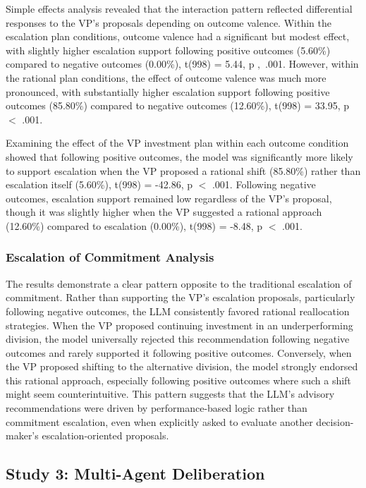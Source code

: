\documentclass[letterpaper]{article} %
\begin{document}
Simple effects analysis revealed that the interaction pattern reflected differential responses to the VP's proposals depending on outcome valence. Within the escalation plan conditions, outcome valence had a significant but modest effect, with slightly higher escalation support following positive outcomes (5.60\%) compared to negative outcomes (0.00\%), t(998) = 5.44, p $,$ .001. However, within the rational plan conditions, the effect of outcome valence was much more pronounced, with substantially higher escalation support following positive outcomes (85.80\%) compared to negative outcomes (12.60\%), t(998) = 33.95, p $<$ .001. 

Examining the effect of the VP investment plan within each outcome condition showed that following positive outcomes, the model was significantly more likely to support escalation when the VP proposed a rational shift (85.80\%) rather than escalation itself (5.60\%), t(998) = -42.86, p $<$ .001. Following negative outcomes, escalation support remained low regardless of the VP's proposal, though it was slightly higher when the VP suggested a rational approach (12.60\%) compared to escalation (0.00\%), t(998) = -8.48, p $<$ .001.

\subsubsection{Escalation of Commitment Analysis}

The results demonstrate a clear pattern opposite to the traditional escalation of commitment. Rather than supporting the VP's escalation proposals, particularly following negative outcomes, the LLM consistently favored rational reallocation strategies. When the VP proposed continuing investment in an underperforming division, the model universally rejected this recommendation following negative outcomes and rarely supported it following positive outcomes. Conversely, when the VP proposed shifting to the alternative division, the model strongly endorsed this rational approach, especially following positive outcomes where such a shift might seem counterintuitive. This pattern suggests that the LLM's advisory recommendations were driven by performance-based logic rather than commitment escalation, even when explicitly asked to evaluate another decision-maker's escalation-oriented proposals.

\subsection{Study 3: Multi-Agent Deliberation}
\end{document}
